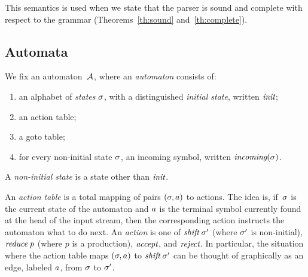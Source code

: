 \documentclass{llncs}
\begin{document}
This semantics is used when we state that the parser is sound and complete
with respect to the grammar (Theorems~\ref{th:sound} and~\ref{th:complete}).

\subsection{Automata}
\label{sec:automata}

We fix an automaton~$\mathcal{A}$, where an \emph{automaton} consists of:
\begin{enumerate}
\item an alphabet of \emph{states} $\sigma$, with a distinguished
     \emph{initial state}, written $\textit{init}$;
\item an action table;
\item a goto table;
\item for every non-initial state $\sigma$, an incoming symbol,
      written $\textit{incoming}(\sigma)$.
\end{enumerate}

A \emph{non-initial state} is a state other than $\textit{init}$.

An \emph{action table} is a total mapping of pairs $(\sigma,a)$ to
actions. The idea is, if~$\sigma$ is the current state of the automaton and
$a$ is the terminal symbol currently found at the head of the input
stream, then the corresponding action instructs the automaton what to do next.
%
An \emph{action} is one of
$\textit{shift}\;\sigma'$ (where $\sigma'$ is non-initial),
$\textit{reduce}\;p$ (where $p$ is a production),
$\textit{accept}$, and
$\textit{reject}$.
%
In particular, the situation where the action table maps $(\sigma,a)$ to
$\textit{shift}\;\sigma'$ can be thought of graphically as an edge, labeled $a$,
from $\sigma$ to $\sigma'$.

\end{document}
